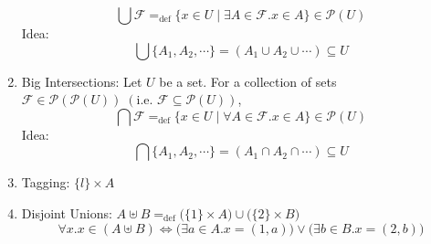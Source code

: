 \documentclass{article}
\begin{document}
\begin{enumerate}
        $$\bigcup\mathcal{F}=_{\text{def}}\{x\in U\;|\;\exists A\in\mathcal{F}.x\in A\}\in\mathcal{P}(U)$$
    Idea: 
        $$\bigcup\{A_1, A_2, \cdots\}=(A_1\cup A_2\cup\cdots)\subseteq U$$
    \item Big Intersections: Let $U$ be a set. For a collection of sets $\mathcal{F}\in\mathcal{P}(\mathcal{P}(U))\;(\text{i.e. }\mathcal{F}\subseteq\mathcal{P}(U))$, 
        $$\bigcap\mathcal{F}=_{\text{def}}\{x\in U\;|\;\forall A\in\mathcal{F}.x\in A\}\in\mathcal{P}(U)$$
    Idea: 
        $$\bigcap\{A_1, A_2, \cdots\}=(A_1\cap A_2\cap\cdots)\subseteq U$$
    \item Tagging: $\{l\}\times A$
    \item Disjoint Unions: $A\uplus B=_\text{def}\big(\{1\}\times A\big)\cup\big(\{2\}\times B\big)$
        $$\forall x.x\in(A\uplus B)\Longleftrightarrow\big(\exists a\in A.x=(1,a)\big)\vee\big(\exists b\in B.x=(2,b)\big)$$
\end{enumerate}
\newpage
\end{document}
